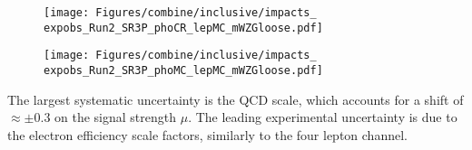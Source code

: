 \label{sec:impacts_SR3P_inclusive}

\begin{figure}
  \centering
  \texttt{[image: Figures/combine/inclusive/impacts\_\\expobs\_Run2\_SR3P\_phoCR\_lepMC\_mWZGloose.pdf]}
  \caption{}
  \label{fig:inclusive_cutID_phoCR_mWZGloose}
\end{figure}

\begin{figure}
  \centering
  \texttt{[image: Figures/combine/inclusive/impacts\_\\expobs\_Run2\_SR3P\_phoMC\_lepMC\_mWZGloose.pdf]}
  \caption{}
  \label{fig:inclusive_cutID_phoMC_mWZGloose}
\end{figure}

The largest systematic uncertainty is the QCD scale, which accounts for a shift of
$\approx \pm 0.3$ on the signal strength $\mu$.
The leading experimental uncertainty is due to the electron efficiency scale factors,
similarly to the four lepton channel.

